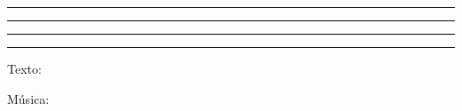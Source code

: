 \begin{titlepage} %
  \vspace*{\baselineskip} %
  \rule{\textwidth}{1.6pt}\vspace*{-\baselineskip}\vspace*{2pt} %
  \rule{\textwidth}{0.4pt} %
  \vspace{0.75\baselineskip} %
  \mytitle
  \vspace{0.75\baselineskip} %
  \rule{\textwidth}{0.4pt}\vspace*{-\baselineskip}\vspace{3.2pt} %
  \rule{\textwidth}{1.6pt} %
  \vspace{5\baselineskip} %

{\Large Texto: \mytext

Música: \mymusic \\}
\end{titlepage}



